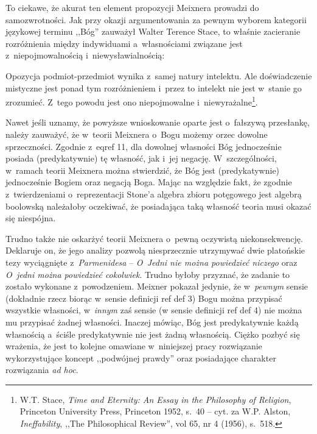 To ciekawe, że akurat ten element propozycji Meixnera prowadzi do samozwrotności. Jak przy okazji argumentowania za pewnym wyborem kategorii językowej terminu ,,Bóg'' zauważył Walter Terence Stace, to właśnie zacieranie rozróżnienia między indywiduami a~własnościami związane jest z~niepojmowalnością i~niewysławialnością:

Opozycja podmiot-przedmiot wynika z~samej natury intelektu. Ale doświadczenie mistyczne jest ponad tym rozróżnieniem i~przez to intelekt nie jest w~stanie go zrozumieć. Z~tego powodu jest ono niepojmowalne i~niewyrażalne\footnote{ W.T. Stace, \textit{Time and Eternity: An Essay in the Philosophy of Religion}, Princeton University Press, Princeton 1952, s.~40 -- cyt. za W.P. Alston, \textit{Ineffability}, ,,The Philosophical Review'', vol 65, nr 4 (1956), s.~518.}.

Nawet jeśli uznamy, że powyższe wnioskowanie oparte jest o~fałszywą przesłankę, należy zauważyć, że w~teorii Meixnera o~Bogu możemy orzec dowolne sprzeczności. Zgodnie z~eqref 11, dla dowolnej własności Bóg jednocześnie posiada (predykatywnie) tę własność, jak i~jej negację. W~szczególności, w~ramach teorii Meixnera można stwierdzić, że Bóg jest (predykatywnie) jednocześnie Bogiem oraz negacją Boga. Mając na względzie fakt, że zgodnie z~twierdzeniami o~reprezentacji Stone'a algebra zbioru potęgowego jest algebrą boolowską należałoby oczekiwać, że posiadająca taką własność teoria musi okazać się niespójna.

Trudno także nie oskarżyć teorii Meixnera o~pewną oczywistą niekonsekwencję. Deklaruje on, że jego analizy pozwolą niesprzecznie utrzymywać dwie platońskie tezy wyciągnięte z~\textit{Parmenidesa} -- \textit{O~Jedni nie można powiedzieć niczego} oraz \textit{O~jedni można powiedzieć cokolwiek}. Trudno byłoby przyznać, że zadanie to zostało wykonane z~powodzeniem. Meixner pokazał jedynie, że w~\textit{pewnym} sensie (dokładnie rzecz biorąc w~sensie definicji ref def 3) Bogu można przypisać wszystkie własności, w~\textit{innym} zaś sensie (w sensie definicji ref def 4) nie można mu przypisać żadnej własności. Inaczej mówiąc, Bóg jest predykatywnie każdą własnością a~ściśle predykatywnie nie jest żadną własnością. Ciężko pozbyć się wrażenia, że jest to kolejne omawiane w~niniejszej pracy rozwiązanie wykorzystujące koncept ,,podwójnej prawdy'' oraz posiadające charakter rozwiązania \textit{ad hoc}.

